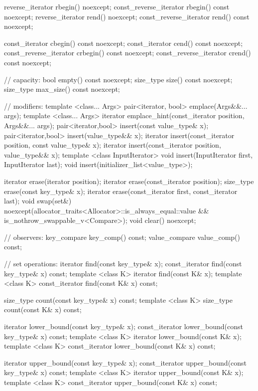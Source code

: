 \begin{codeblock}
{{    reverse_iterator       rbegin() noexcept;
    const_reverse_iterator rbegin() const noexcept;
    reverse_iterator       rend() noexcept;
    const_reverse_iterator rend() const noexcept;

    const_iterator         cbegin() const noexcept;
    const_iterator         cend() const noexcept;
    const_reverse_iterator crbegin() const noexcept;
    const_reverse_iterator crend() const noexcept;

    // capacity:
    bool      empty() const noexcept;
    size_type size() const noexcept;
    size_type max_size() const noexcept;

    // modifiers:
    template <class... Args> pair<iterator, bool> emplace(Args&&... args);
    template <class... Args> iterator emplace_hint(const_iterator position, Args&&... args);
    pair<iterator,bool> insert(const value_type& x);
    pair<iterator,bool> insert(value_type&& x);
    iterator insert(const_iterator position, const value_type& x);
    iterator insert(const_iterator position, value_type&& x);
    template <class InputIterator>
      void insert(InputIterator first, InputIterator last);
    void insert(initializer_list<value_type>);

    iterator  erase(iterator position);
    iterator  erase(const_iterator position);
    size_type erase(const key_type& x);
    iterator  erase(const_iterator first, const_iterator last);
    void      swap(set&)
      noexcept(allocator_traits<Allocator>::is_always_equal::value &&
               is_nothrow_swappable_v<Compare>);
    void      clear() noexcept;

    // observers:
    key_compare key_comp() const;
    value_compare value_comp() const;

    // set operations:
    iterator       find(const key_type& x);
    const_iterator find(const key_type& x) const;
    template <class K> iterator       find(const K& x);
    template <class K> const_iterator find(const K& x) const;

    size_type      count(const key_type& x) const;
    template <class K> size_type count(const K& x) const;

    iterator       lower_bound(const key_type& x);
    const_iterator lower_bound(const key_type& x) const;
    template <class K> iterator       lower_bound(const K& x);
    template <class K> const_iterator lower_bound(const K& x) const;

    iterator       upper_bound(const key_type& x);
    const_iterator upper_bound(const key_type& x) const;
    template <class K> iterator       upper_bound(const K& x);
    template <class K> const_iterator upper_bound(const K& x) const;

}}
\end{codeblock}
